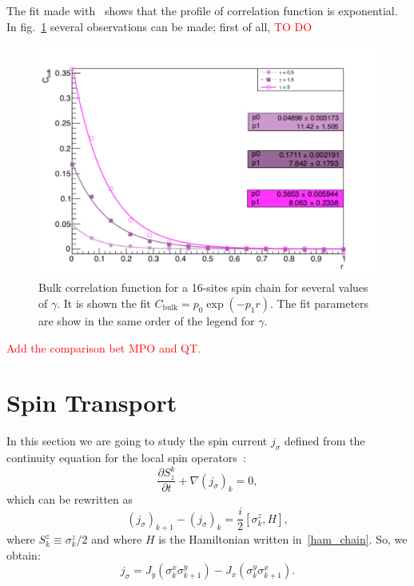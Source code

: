 The fit made with~\cite{root_cern} shows that the profile of correlation function is exponential. In fig.~\ref{fig:FIT_16sites_CFBulkCONN} several observations can be made; first of all, \textcolor{red}{TO DO}

\begin{figure}[H]
    \centering
    \includegraphics[scale=0.7]{Figures/16sites/FIT_16sites_CFBulkCONN.pdf}
    \captionsetup{width=1.\linewidth}
    \caption{Bulk correlation function for a 16-sites spin chain for several values of $\gamma$. It is shown the fit $C_{\text{bulk}} = p_0 \exp{(-p_1 r)}$. The fit parameters are show in the same order of the legend for $\gamma$.}
    \label{fig:FIT_16sites_CFBulkCONN}
\end{figure}

\textcolor{red}{Add the comparison bet MPO and QT.}

\section{Spin Transport}
In this section we are going to study the spin current $j_\sigma$ defined from the continuity equation for the local spin operators~\cite{BenentiCasatiProsenRossini}:
\begin{equation}
    \frac{\partial S^k_z}{\partial t} + \nabla (j_\sigma)_k = 0,
\end{equation}
which can be rewritten as
\begin{equation}
    (j_\sigma)_{k+1}-(j_\sigma)_k = \frac{i}{2}[\sigma_k^z , H],
\end{equation}
where $S_k^z \equiv \sigma_k^z/2$ and where $H$ is the Hamiltonian written in~\ref{ham_chain}. So, we obtain:
\begin{equation}
    j_\sigma = J_y (\sigma_k^x \sigma_{k+1}^y) - J_x (\sigma_k^y \sigma_{k+1}^x). 
\end{equation}


